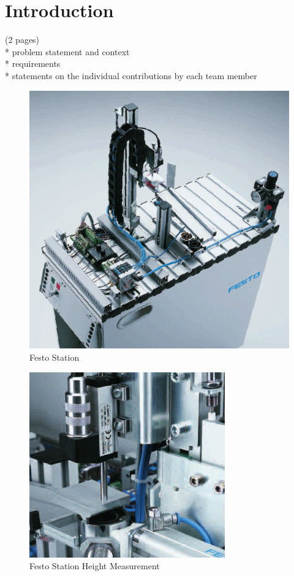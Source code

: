 \chapter{Introduction}

(2 pages)\\
* problem statement and context\\
* requirements\\
* statements on the individual contributions by each team member

\begin{figure}[H]
	\begin{center}
		\includegraphics[scale=.50]{media/FestoStation.png} 	
		\caption{Festo Station}
		\label{fig:festostation}
	\end{center}
\end{figure}

\begin{figure}[H]
	\begin{center}
		\includegraphics[scale=.50]{media/FestoStation_HeighMeasurement.png} 	
		\caption{Festo Station Height Measurement}
		\label{fig:festostationheightmeasurement}
	\end{center}
\end{figure}

